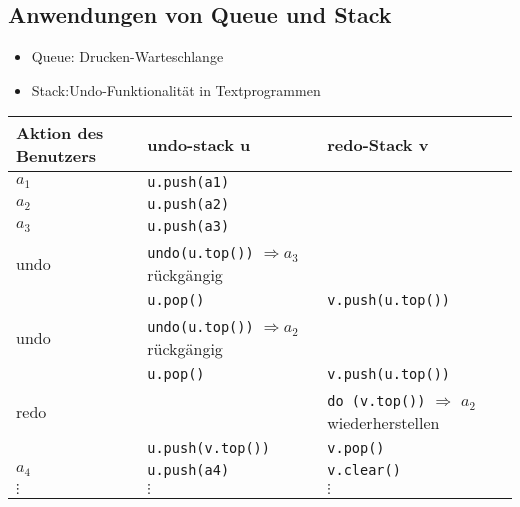         \subsection*{Anwendungen von Queue und Stack}
        \begin{itemize}
            \item Queue: Drucken-Warteschlange
            \item Stack:Undo-Funktionalität in Textprogrammen
        \end{itemize}

        \begin{tabular}{C{5cm} | C{5cm} | C{5cm}}
            Aktion des Benutzers & undo-stack u & redo-Stack v \\ \hline
            $a_1$ & \verb|u.push(a1)| & \\
            $a_2$ & \verb|u.push(a2)| & \\
            $a_3$ & \verb|u.push(a3)| & \\ \hline
            undo & \verb|undo(u.top())| $\Rightarrow a_3$ rückgängig & \\
            & \verb|u.pop()| & \verb|v.push(u.top())|\\ \hline
            undo & \verb|undo(u.top())| $\Rightarrow a_2$ rückgängig & \\
            & \verb|u.pop()| & \verb|v.push(u.top())|\\ \hline
            redo & & \verb|do (v.top())| $\Rightarrow$ $a_2$ wiederherstellen \\
            & \verb|u.push(v.top())| & \verb|v.pop()| \\ \hline
            $a_4$ & \verb|u.push(a4)| & \verb|v.clear()| \\
            $\vdots$ & $\vdots$ & $\vdots$ \\
        \end{tabular}



